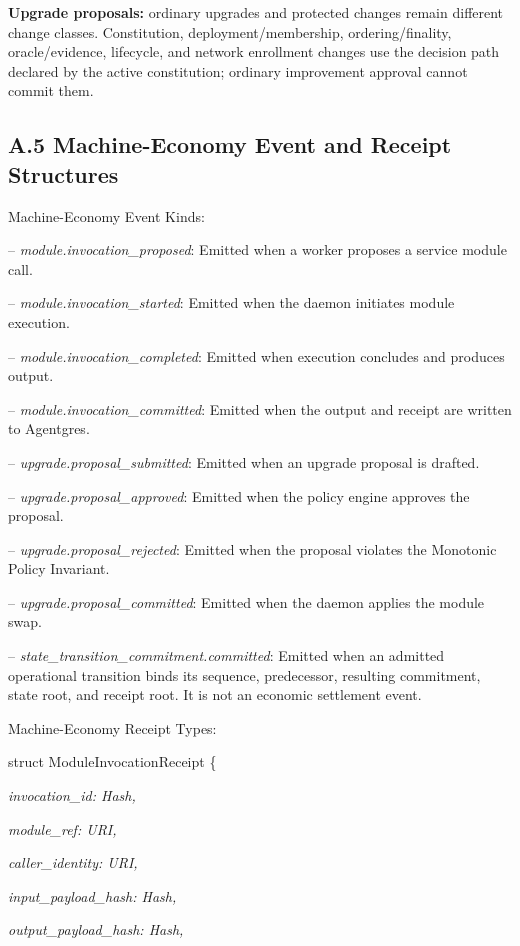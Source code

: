 \documentclass[
  11pt,
]{article}
\begin{document}
\textbf{Upgrade proposals:} ordinary upgrades and protected changes remain
different change classes. Constitution, deployment/membership,
ordering/finality, oracle/evidence, lifecycle, and network enrollment changes
use the decision path declared by the active constitution; ordinary improvement
approval cannot commit them.

\hypertarget{a.5-machine-economy-event-and-receipt-structures}{%
\subsection{A.5 Machine-Economy Event and Receipt
Structures}\label{a.5-machine-economy-event-and-receipt-structures}}

Machine-Economy Event Kinds:

-- \emph{module.invocation\_proposed}: Emitted when a worker proposes a
service module call.

-- \emph{module.invocation\_started}: Emitted when the daemon initiates
module execution.

-- \emph{module.invocation\_completed}: Emitted when execution concludes
and produces output.

-- \emph{module.invocation\_committed}: Emitted when the output and
receipt are written to Agentgres.

-- \emph{upgrade.proposal\_submitted}: Emitted when an upgrade proposal
is drafted.

-- \emph{upgrade.proposal\_approved}: Emitted when the policy engine
approves the proposal.

-- \emph{upgrade.proposal\_rejected}: Emitted when the proposal violates
the Monotonic Policy Invariant.

-- \emph{upgrade.proposal\_committed}: Emitted when the daemon applies
the module swap.

-- \emph{state\_transition\_commitment.committed}: Emitted when an admitted
operational transition binds its sequence, predecessor, resulting commitment,
state root, and receipt root. It is not an economic settlement event.

Machine-Economy Receipt Types:

struct ModuleInvocationReceipt \{

\emph{invocation\_id: Hash,}

\emph{module\_ref: URI,}

\emph{caller\_identity: URI,}

\emph{input\_payload\_hash: Hash,}

\emph{output\_payload\_hash: Hash,}
\end{document}
